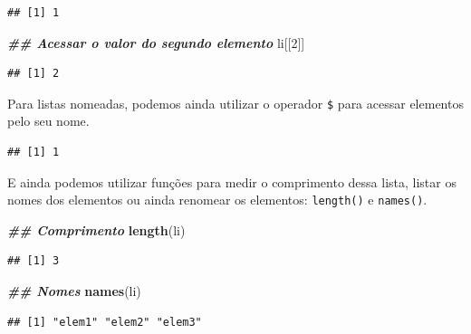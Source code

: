 \documentclass[
]{article}
\newenvironment{Shaded}{\begin{snugshade}}{\end{snugshade}}
\newcommand{\DecValTok}[1]{\textcolor[rgb]{0.00,0.00,0.81}{#1}}
\newcommand{\DocumentationTok}[1]{\textcolor[rgb]{0.56,0.35,0.01}{\textbf{\textit{#1}}}}
\newcommand{\FunctionTok}[1]{\textcolor[rgb]{0.13,0.29,0.53}{\textbf{#1}}}
\newcommand{\NormalTok}[1]{#1}
\newcommand{\SpecialCharTok}[1]{\textcolor[rgb]{0.81,0.36,0.00}{\textbf{#1}}}
\begin{document}
\begin{verbatim}
## [1] 1
\end{verbatim}

\begin{Shaded}
\begin{Highlighting}[]
\DocumentationTok{\#\# Acessar o valor do segundo elemento}
\NormalTok{li[[}\DecValTok{2}\NormalTok{]]}
\end{Highlighting}
\end{Shaded}

\begin{verbatim}
## [1] 2
\end{verbatim}

Para listas nomeadas, podemos ainda utilizar o operador \texttt{\$} para acessar elementos pelo seu nome.

\begin{Shaded}
\end{Shaded}

\begin{verbatim}
## [1] 1
\end{verbatim}

E ainda podemos utilizar funções para medir o comprimento dessa lista, listar os nomes dos elementos ou ainda renomear os elementos: \texttt{length()} e \texttt{names()}.

\begin{Shaded}
\begin{Highlighting}[]
\DocumentationTok{\#\# Comprimento}
\FunctionTok{length}\NormalTok{(li)}
\end{Highlighting}
\end{Shaded}

\begin{verbatim}
## [1] 3
\end{verbatim}

\begin{Shaded}
\begin{Highlighting}[]
\DocumentationTok{\#\# Nomes}
\FunctionTok{names}\NormalTok{(li)}
\end{Highlighting}
\end{Shaded}

\begin{verbatim}
## [1] "elem1" "elem2" "elem3"
\end{verbatim}
\end{document}
